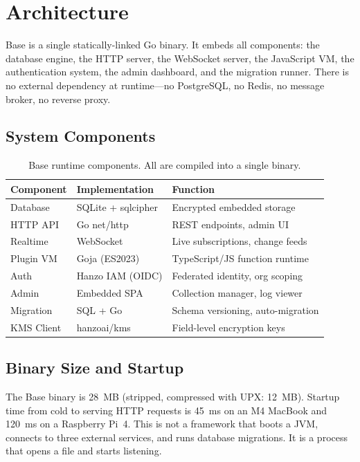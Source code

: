 \documentclass[11pt]{article}
\begin{document}
\section{Architecture}
\label{sec:architecture}

Base is a single statically-linked Go binary. It embeds all components: the
database engine, the HTTP server, the WebSocket server, the JavaScript VM, the
authentication system, the admin dashboard, and the migration runner. There is
no external dependency at runtime---no PostgreSQL, no Redis, no message broker,
no reverse proxy.

\subsection{System Components}

\begin{table}[H]
\centering
\small
\begin{tabular}{llp{5.5cm}}
\toprule
\textbf{Component} & \textbf{Implementation} & \textbf{Function} \\
\midrule
Database & SQLite + sqlcipher & Encrypted embedded storage \\
HTTP API & Go net/http & REST endpoints, admin UI \\
Realtime & WebSocket & Live subscriptions, change feeds \\
Plugin VM & Goja (ES2023) & TypeScript/JS function runtime \\
Auth & Hanzo IAM (OIDC) & Federated identity, org scoping \\
Admin & Embedded SPA & Collection manager, log viewer \\
Migration & SQL + Go & Schema versioning, auto-migration \\
KMS Client & hanzoai/kms & Field-level encryption keys \\
\bottomrule
\end{tabular}
\caption{Base runtime components. All are compiled into a single binary.}
\label{tab:components}
\end{table}

\subsection{Binary Size and Startup}

The Base binary is 28~MB (stripped, compressed with UPX: 12~MB). Startup time
from cold to serving HTTP requests is 45~ms on an M4 MacBook and 120~ms on a
Raspberry Pi~4. This is not a framework that boots a JVM, connects to three
external services, and runs database migrations. It is a process that opens a
file and starts listening.
\end{document}
